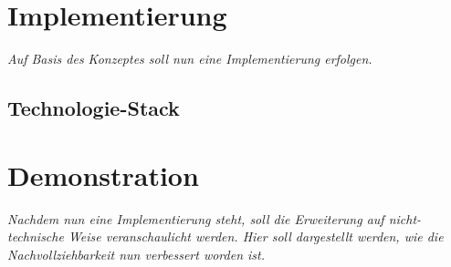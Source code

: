 \section{Implementierung}

	\textit{Auf Basis des Konzeptes soll nun eine Implementierung erfolgen.}

	\subsection{Technologie-Stack}

\section{Demonstration}

	\textit{Nachdem nun eine Implementierung steht, soll die Erweiterung auf nicht-technische Weise veranschaulicht werden. Hier soll dargestellt werden, wie die Nachvollziehbarkeit nun verbessert worden ist.}